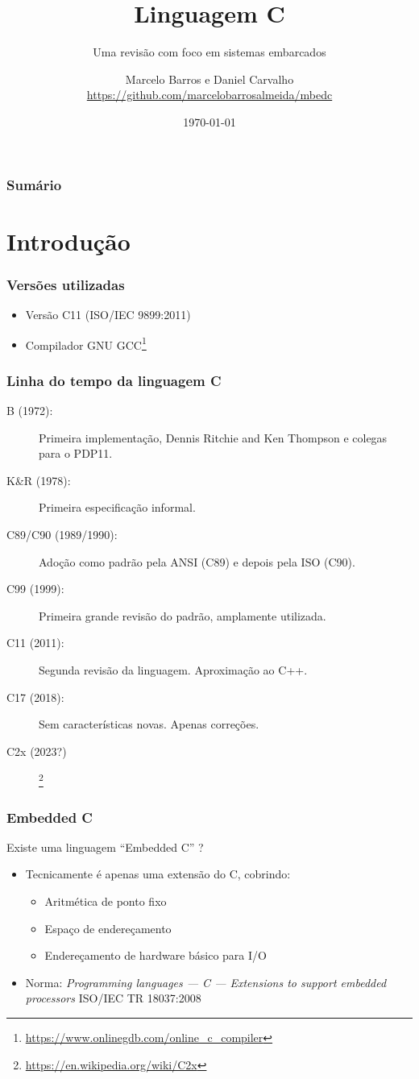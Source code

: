 \documentclass{beamer}
\title{Linguagem C}
\subtitle{Uma revisão com foco em sistemas embarcados}
\author{Marcelo Barros e Daniel Carvalho
{\tiny \url{https://github.com/marcelobarrosalmeida/mbedc}}}
\institute{UFU/FEELT}
\date{\today}
\begin{document}
\begin{frame}
\titlepage
\end{frame}

\begin{frame}
\frametitle{Sumário}
\tableofcontents
\end{frame}

\section{Introdução}
	
\begin{frame}
	\frametitle{Versões utilizadas}
	\begin{itemize}
		\item Versão C11 (ISO/IEC 9899:2011)
		\item Compilador GNU GCC\footnote{\url{https://www.onlinegdb.com/online_c_compiler}}
	\end{itemize}
\end{frame}

\begin{frame}
	\frametitle{Linha do tempo da linguagem C}
	\begin{description}
		\item[ B (1972):] Primeira implementação, Dennis Ritchie and Ken Thompson e colegas para o PDP11.
		\item [K\&R (1978):] Primeira especificação informal.
		\item [C89/C90 (1989/1990):] Adoção como padrão pela ANSI (C89) e depois pela ISO (C90).
		\item [C99 (1999):] Primeira grande revisão do padrão, amplamente utilizada.
		\item [C11 (2011):] Segunda revisão da linguagem. Aproximação ao C++. 
		\item [C17 (2018):] Sem características novas. Apenas correções.
		\item [C2x (2023?)]\footnote{\url{https://en.wikipedia.org/wiki/C2x}}
	\end{description}
\end{frame}

\begin{frame}
	\frametitle{Embedded C}
	{Existe uma linguagem ``Embedded C'' ?}
	\vspace*{0.5cm}
	\begin{itemize}
		\item Tecnicamente é apenas uma extensão do C, cobrindo:
	\begin{itemize}
		\item Aritmética de ponto fixo
		\item Espaço de endereçamento
		\item Endereçamento de hardware básico para I/O
	\end{itemize}
		\item Norma: \textit{Programming languages — C — Extensions to support embedded processors}
		ISO/IEC TR 18037:2008
	\end{itemize}
\end{frame}
\end{document}
